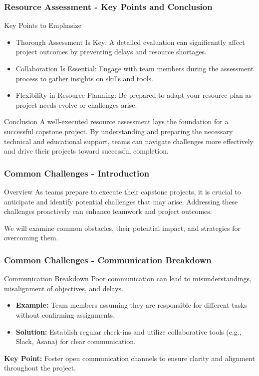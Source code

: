 \documentclass[aspectratio=169]{beamer}
\begin{document}
\begin{frame}[fragile]
    \frametitle{Resource Assessment - Key Points and Conclusion}
    \begin{block}{Key Points to Emphasize}
        \begin{itemize}
            \item Thorough Assessment Is Key: A detailed evaluation can significantly affect project outcomes by preventing delays and resource shortages.
            \item Collaboration Is Essential: Engage with team members during the assessment process to gather insights on skills and tools.
            \item Flexibility in Resource Planning: Be prepared to adapt your resource plan as project needs evolve or challenges arise.
        \end{itemize}
    \end{block}

    \begin{block}{Conclusion}
        A well-executed resource assessment lays the foundation for a successful capstone project. By understanding and preparing the necessary technical and educational support, teams can navigate challenges more effectively and drive their projects toward successful completion. 
    \end{block}
\end{frame}

\begin{frame}[fragile]
  \frametitle{Common Challenges - Introduction}
  \begin{block}{Overview}
    As teams prepare to execute their capstone projects, it is crucial to anticipate and identify potential challenges that may arise. Addressing these challenges proactively can enhance teamwork and project outcomes.
  \end{block}
  We will examine common obstacles, their potential impact, and strategies for overcoming them.
\end{frame}

\begin{frame}[fragile]
  \frametitle{Common Challenges - Communication Breakdown}
  \begin{block}{Communication Breakdown}
    Poor communication can lead to misunderstandings, misalignment of objectives, and delays.
  \end{block}
  \begin{itemize}
    \item \textbf{Example:} Team members assuming they are responsible for different tasks without confirming assignments.
    \item \textbf{Solution:} Establish regular check-ins and utilize collaborative tools (e.g., Slack, Asana) for clear communication.
  \end{itemize}
  \textbf{Key Point:} Foster open communication channels to ensure clarity and alignment throughout the project.
\end{frame}
\end{document}
